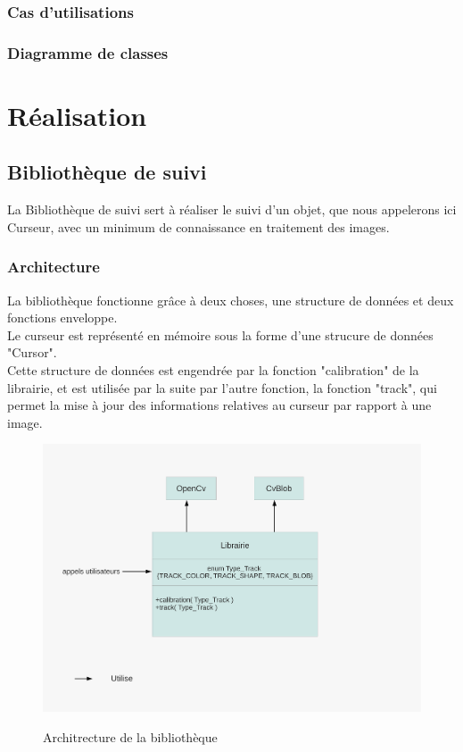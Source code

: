 \documentclass{report}
\begin{document}
			\subsection{Cas d'utilisations}
			\subsection{Diagramme de classes}
	
	\chapter{Réalisation}
		\section{Bibliothèque de suivi}
			La Bibliothèque de suivi sert à réaliser le suivi d'un objet, que nous appelerons ici Curseur, avec un minimum de connaissance en traitement des images.\\
			\subsection{Architecture}
					La bibliothèque fonctionne grâce à deux choses, une structure de données et deux fonctions enveloppe. \\
					Le curseur est représenté en mémoire sous la forme d'une strucure de données "Cursor". \\
					Cette structure de données est engendrée par la fonction "calibration" de la librairie, et est utilisée par la suite par l'autre fonction, la fonction "track", qui permet la mise à jour des informations relatives au curseur par rapport à une image.
					\begin{figure}[!h]
						\centering
						\includegraphics[scale=0.55]{../soutenance/schema-librairie.pdf}\\
						\caption{Architrecture de la bibliothèque}
						\label{Architrecture de la bibliothèque}
					\end{figure}
				\newpage
\end{document}
